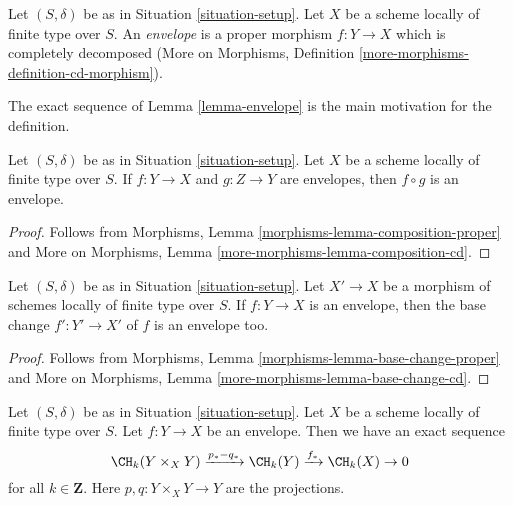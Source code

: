 \begin{definition}
\label{definition-envelope}
\begin{reference}
\cite[Definition 18.3]{F}
\end{reference}
Let $(S, \delta)$ be as in Situation \ref{situation-setup}.
Let $X$ be a scheme locally of finite type over $S$.
An {\it envelope} is a proper morphism $f : Y \to X$
which is completely decomposed
(More on Morphisms, Definition \ref{more-morphisms-definition-cd-morphism}).
\end{definition}

\noindent
The exact sequence of Lemma \ref{lemma-envelope}
is the main motivation for the definition.

\begin{lemma}
\label{lemma-composition-envelope}
Let $(S, \delta)$ be as in Situation \ref{situation-setup}.
Let $X$ be a scheme locally of finite type over $S$.
If $f : Y \to X$ and $g : Z \to Y$ are envelopes, then
$f \circ g$ is an envelope.
\end{lemma}

\begin{proof}
Follows from Morphisms, Lemma \ref{morphisms-lemma-composition-proper}
and More on Morphisms, Lemma \ref{more-morphisms-lemma-composition-cd}.
\end{proof}

\begin{lemma}
\label{lemma-base-change-envelope}
Let $(S, \delta)$ be as in Situation \ref{situation-setup}.
Let $X' \to X$ be a morphism of schemes locally of finite type over $S$.
If $f : Y \to X$ is an envelope, then the base change $f' : Y' \to X'$
of $f$ is an envelope too.
\end{lemma}

\begin{proof}
Follows from Morphisms, Lemma \ref{morphisms-lemma-base-change-proper}
and More on Morphisms, Lemma \ref{more-morphisms-lemma-base-change-cd}.
\end{proof}

\begin{lemma}
\label{lemma-envelope}
Let $(S, \delta)$ be as in Situation \ref{situation-setup}.
Let $X$ be a scheme locally of finite type over $S$.
Let $f : Y \to X$ be an envelope. Then
we have an exact sequence
$$
\CH_k(Y \times_X Y) \xrightarrow{p_* - q_*}
\CH_k(Y) \xrightarrow{f_*}
\CH_k(X) \to 0
$$
for all $k \in \mathbf{Z}$. Here $p, q : Y \times_X Y \to Y$ are
the projections.
\end{lemma}

